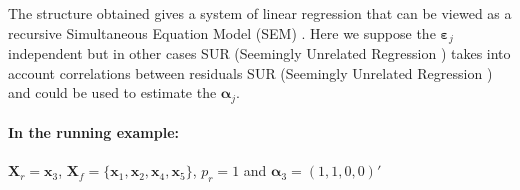 \documentclass[11pt,a4paper]{article}
\begin{document}
The structure obtained gives a system of linear regression that can be viewed as a recursive Simultaneous Equation Model (\textsc{SEM})\cite{davidson1993estimation} \cite{TIMM}.
  	Here we suppose the $\boldsymbol{\varepsilon}_j$ independent but in other cases \textsc{SUR} (Seemingly Unrelated Regression \cite{SURzellner}) takes into account correlations between residuals \textsc{SUR} (Seemingly Unrelated Regression \cite{SURzellner}) and could be used to estimate the $\boldsymbol{\alpha}_j$. 
		 
	 
\paragraph{In the running example:}$\boldsymbol{X}_r=\boldsymbol{x}_3$, $\boldsymbol{X}_f=\{\boldsymbol{x}_1,\boldsymbol{x}_2,\boldsymbol{x}_4,\boldsymbol{x}_5 \}$, $p_r=1$ and $\boldsymbol{\alpha}_3=(1,1,0,0)'$

	
\end{document}
